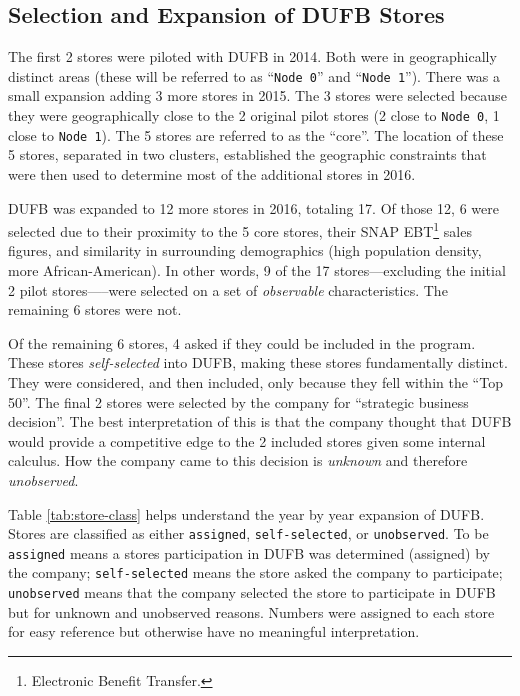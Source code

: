 \documentclass[12pt,letterpaperpaper,]{book}
\begin{document}
\subsection*{Selection and Expansion of DUFB
Stores}\label{selection-and-expansion-of-dufb-stores}

The first 2 stores were piloted with DUFB in 2014. Both were in
geographically distinct areas (these will be referred to as
``\texttt{Node\ 0}'' and ``\texttt{Node\ 1}''). There was a small
expansion adding 3 more stores in 2015. The 3 stores were selected
because they were geographically close to the 2 original pilot stores (2
close to \texttt{Node\ 0}, 1 close to \texttt{Node\ 1}). The 5 stores
are referred to as the ``core''. The location of these 5 stores,
separated in two clusters, established the geographic constraints that
were then used to determine most of the additional stores in 2016.

DUFB was expanded to 12 more stores in 2016, totaling 17. Of those 12, 6
were selected due to their proximity to the 5 core stores, their SNAP
EBT\footnote{Electronic Benefit Transfer.} sales figures, and similarity
in surrounding demographics (high population density, more
African-American). In other words, 9 of the 17 stores---excluding the
initial 2 pilot stores-----were selected on a set of \emph{observable}
characteristics. The remaining 6 stores were not.

Of the remaining 6 stores, 4 asked if they could be included in the
program. These stores \emph{self-selected} into DUFB, making these
stores fundamentally distinct. They were considered, and then included,
only because they fell within the ``Top 50''. The final 2 stores were
selected by the company for ``strategic business decision''. The best
interpretation of this is that the company thought that DUFB would
provide a competitive edge to the 2 included stores given some internal
calculus. How the company came to this decision is \emph{unknown} and
therefore \emph{unobserved}.

Table \ref{tab:store-class} helps understand the year by year expansion
of DUFB. Stores are classified as either \texttt{assigned},
\texttt{self-selected}, or \texttt{unobserved}. To be \texttt{assigned}
means a stores participation in DUFB was determined (assigned) by the
company; \texttt{self-selected} means the store asked the company to
participate; \texttt{unobserved} means that the company selected the
store to participate in DUFB but for unknown and unobserved reasons.
Numbers were assigned to each store for easy reference but otherwise
have no meaningful interpretation.
\end{document}
